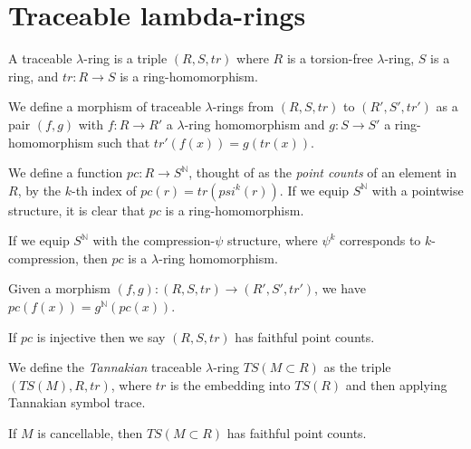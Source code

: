 
\section{Traceable lambda-rings}

\begin{definition}
  A traceable $\lambda$-ring is a triple $(R, S, tr)$ where $R$ is a torsion-free $\lambda$-ring, $S$ is a ring, and $tr: R \to S$ is a ring-homomorphism.  
\end{definition}

\begin{definition}
  We define a morphism of traceable $\lambda$-rings from $(R, S, tr)$ to $(R', S', tr')$ as a pair $(f, g)$ with $f : R \to R'$ a $\lambda$-ring homomorphism and $g : S \to S'$ a ring-homomorphism such that $tr'(f(x)) = g(tr(x))$.
\end{definition}

\begin{definition}
  We define a function $pc : R \to S^{\mathbb{N}}$, thought of as the \emph{point counts} of an element in $R$, by the $k$-th index of $pc(r) = tr(psi^k(r))$. If we equip $S^{\mathbb{N}}$ with a pointwise structure, it is clear that $pc$ is a ring-homomorphism. 
\end{definition}

\begin{proposition}
  If we equip $S^{\mathbb{N}}$ with the compression-$\psi$ structure, where $\psi^k$ corresponds to $k$-compression, then $pc$ is a $\lambda$-ring homomorphism.
\end{proposition}

\begin{proposition}
  Given a morphism $(f, g) : (R, S, tr) \to (R', S', tr')$, we have $pc(f(x)) = g^{\mathbb{N}}(pc(x))$.
\end{proposition}

\begin{definition}
  If $pc$ is injective then we say $(R, S, tr)$ has faithful point counts. 
\end{definition}

\begin{definition}
  We define the \emph{Tannakian} traceable $\lambda$-ring $TS(M \subset R)$ as the triple $(TS(M), R, tr)$, where $tr$ is the embedding into $TS(R)$ and then applying Tannakian symbol trace. 
\end{definition}

\begin{proposition}
  If $M$ is cancellable, then $TS(M \subset R)$ has faithful point counts. 
\end{proposition}
